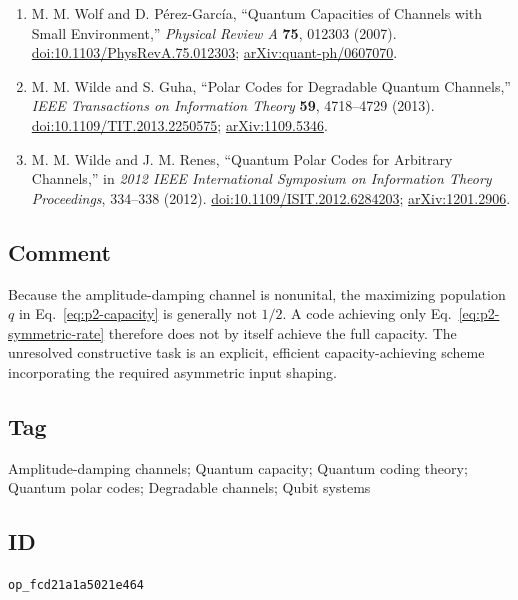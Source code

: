 \begin{enumerate}[label={},leftmargin=4.8em,labelsep=0.5em]
  \footnotesize
  \item[\textup{[WPG07]}]\label{ref:p2-wolf}
  M. M. Wolf and D. P\'erez-Garc\'ia, ``Quantum Capacities of Channels with
  Small Environment,'' \emph{Physical Review A} \textbf{75}, 012303 (2007).
  \href{https://doi.org/10.1103/PhysRevA.75.012303}{doi:10.1103/PhysRevA.75.012303};
  \href{https://arxiv.org/abs/quant-ph/0607070}{arXiv:quant-ph/0607070}.

  \item[\textup{[WG13]}]\label{ref:p2-wilde-guha}
  M. M. Wilde and S. Guha, ``Polar Codes for Degradable Quantum Channels,''
  \emph{IEEE Transactions on Information Theory} \textbf{59}, 4718--4729
  (2013). \href{https://doi.org/10.1109/TIT.2013.2250575}{doi:10.1109/TIT.2013.2250575};
  \href{https://arxiv.org/abs/1109.5346}{arXiv:1109.5346}.

  \item[\textup{[WR12]}]\label{ref:p2-wilde-renes}
  M. M. Wilde and J. M. Renes, ``Quantum Polar Codes for Arbitrary Channels,''
  in \emph{2012 IEEE International Symposium on Information Theory
  Proceedings}, 334--338 (2012).
  \href{https://doi.org/10.1109/ISIT.2012.6284203}{doi:10.1109/ISIT.2012.6284203};
  \href{https://arxiv.org/abs/1201.2906}{arXiv:1201.2906}.
\end{enumerate}

\subsection*{Comment}

Because the amplitude-damping channel is nonunital, the maximizing population
$q$ in Eq.~\eqref{eq:p2-capacity} is generally not $1/2$.  A code achieving
only Eq.~\eqref{eq:p2-symmetric-rate} therefore does not by itself achieve the
full capacity.  The unresolved constructive task is an explicit, efficient
capacity-achieving scheme incorporating the required asymmetric input shaping.

\subsection*{Tag}

Amplitude-damping channels; Quantum capacity; Quantum coding theory;
Quantum polar codes; Degradable channels; Qubit systems

\subsection*{ID}

\texttt{op\_fcd21a1a5021e464}
